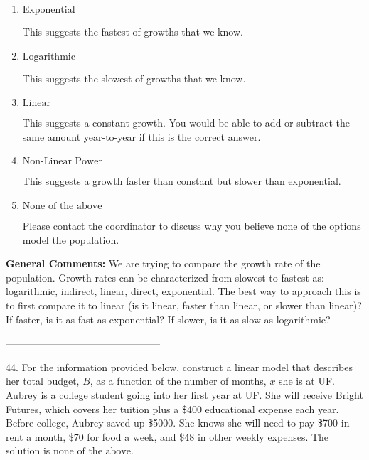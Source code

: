 \documentclass{extbook}[14pt]
\begin{document}
\begin{enumerate}[label=\Alph*.] 
\item $ \text{Exponential} $ 

 This suggests the fastest of growths that we know. 
\item $ \text{Logarithmic} $ 

 This suggests the slowest of growths that we know. 
\item $ \text{Linear} $ 

 This suggests a constant growth. You would be able to add or subtract the same amount year-to-year if this is the correct answer. 
\item $ \text{Non-Linear Power} $ 

 This suggests a growth faster than constant but slower than exponential. 
\item $ \text{None of the above} $ 

 Please contact the coordinator to discuss why you believe none of the options model the population. 
\end{enumerate} 
 
\textbf{General Comments:} We are trying to compare the growth rate of the population. Growth rates can be characterized from slowest to fastest as: logarithmic, indirect, linear, direct, exponential. The best way to approach this is to first compare it to linear (is it linear, faster than linear, or slower than linear)? If faster, is it as fast as exponential? If slower, is it as slow as logarithmic?

-----------------------------------------------

44. For the information provided below, construct a linear model that describes her total budget, $B$, as a function of the number of months, $x$ she is at UF.
Aubrey is a college student going into her first year at UF. She will receive Bright Futures, which covers her tuition plus a \$400 educational expense each year. Before college, Aubrey saved up \$5000. She knows she will need to pay \$700 in rent a month, \$70 for food a week, and \$48 in other weekly expenses. 
The solution is $ \text{none of the above.} $ 
\end{document}
